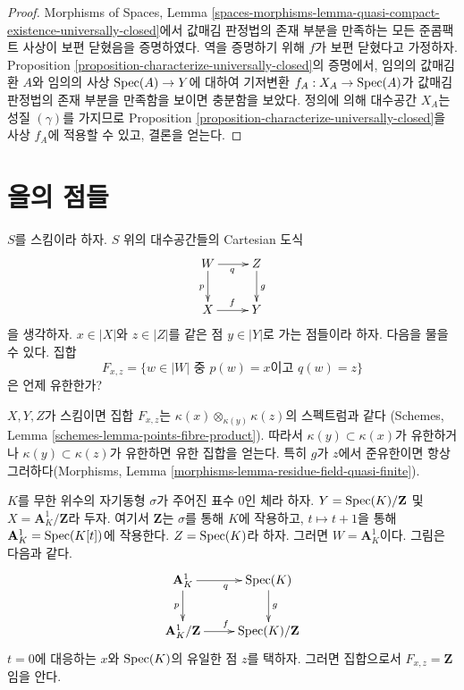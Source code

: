 \begin{proof}
Morphisms of Spaces, Lemma
\ref{spaces-morphisms-lemma-quasi-compact-existence-universally-closed}에서
값매김 판정법의 존재 부분을 만족하는 모든 준콤팩트 사상이 보편
닫혔음을 증명하였다. 역을 증명하기 위해 $f$가 보편 닫혔다고 가정하자.
Proposition \ref{proposition-characterize-universally-closed}의 증명에서,
임의의 값매김환 $A$와 임의의 사상 $\mathop{\mathrm{Spec}}(A) \to Y$에 대하여 기저변환
$f_A : X_A \to \mathop{\mathrm{Spec}}(A)$가 값매김 판정법의 존재 부분을 만족함을
보이면 충분함을 보았다. 정의에 의해 대수공간 $X_A$는 성질 $(\gamma)$를
가지므로 Proposition \ref{proposition-characterize-universally-closed}을
사상 $f_A$에 적용할 수 있고, 결론을 얻는다.
\end{proof}

\section{올의 점들}
\label{section-points-fibres}

\noindent
$S$를 스킴이라 하자. $S$ 위의 대수공간들의 Cartesian 도식
\begin{equation}
\label{equation-points-fibres}
\xymatrix{
W \ar[r]_q \ar[d]_p & Z \ar[d]^g \\
X \ar[r]^f & Y
}
\end{equation}
을 생각하자. $x \in |X|$와 $z \in |Z|$를 같은 점 $y \in |Y|$로
가는 점들이라 하자. 다음을 물을 수 있다. 집합
\begin{equation}
\label{equation-fibre}
F_{x, z} = \{ w \in |W| \text{ 중 }p(w) = x\text{이고 }q(w) = z\}
\end{equation}
은 언제 유한한가?

\begin{example}
\label{example-schemes}
$X, Y, Z$가 스킴이면 집합 $F_{x, z}$는
$\kappa(x) \otimes_{\kappa(y)} \kappa(z)$의 스펙트럼과 같다
(Schemes, Lemma \ref{schemes-lemma-points-fibre-product}). 따라서
$\kappa(y) \subset \kappa(x)$가 유한하거나
$\kappa(y) \subset \kappa(z)$가 유한하면 유한 집합을 얻는다.
특히 $g$가 $z$에서 준유한이면 항상 그러하다(Morphisms, Lemma
\ref{morphisms-lemma-residue-field-quasi-finite}).
\end{example}

\begin{example}
\label{example-not-finite}
$K$를 무한 위수의 자기동형 $\sigma$가 주어진 표수 $0$인 체라 하자.
$Y = \mathop{\mathrm{Spec}}(K)/\mathbf{Z}$ 및 $X = \mathbf{A}^1_K/\mathbf{Z}$라 두자.
여기서 $\mathbf{Z}$는 $\sigma$를 통해 $K$에 작용하고,
$t \mapsto t + 1$을 통해 $\mathbf{A}^1_K = \mathop{\mathrm{Spec}}(K[t])$에 작용한다.
$Z = \mathop{\mathrm{Spec}}(K)$라 하자. 그러면 $W = \mathbf{A}^1_K$이다. 그림은
다음과 같다.
$$
\xymatrix{
\mathbf{A}^1_K \ar[r]_q \ar[d]_p & \Spec(K) \ar[d]^g \\
\mathbf{A}^1_K/\mathbf{Z} \ar[r]^f & \Spec(K)/\mathbf{Z}
}
$$
$t = 0$에 대응하는 $x$와 $\mathop{\mathrm{Spec}}(K)$의 유일한 점 $z$를 택하자.
그러면 집합으로서 $F_{x, z} = \mathbf{Z}$임을 안다.
\end{example}

